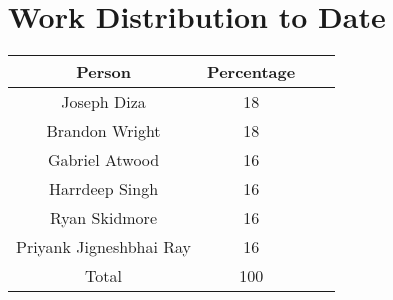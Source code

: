 \section{Work Distribution to Date}

\begin{table}[!htbp]
    \centering
    \begin{tabular}{ *{2}{cc} }
        \toprule
        Person & Percentage \\
        \midrule
        Joseph Diza             & 18 \\
        Brandon Wright          & 18 \\
        Gabriel Atwood          & 16 \\
        Harrdeep Singh          & 16 \\
        Ryan Skidmore           & 16 \\
        Priyank Jigneshbhai Ray & 16 \\
        \midrule
        Total                   & 100 \\
        \bottomrule
    \end{tabular}
    \label{tab:contributions}
\end{table}

